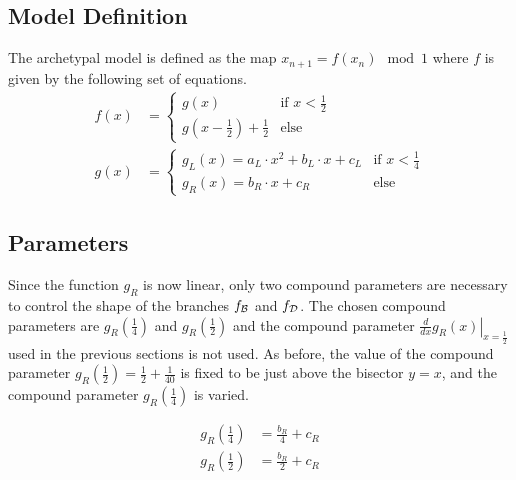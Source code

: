 \subsection{Model Definition}
\label{sec:setup.arch.definition}

The archetypal model is defined as the map $x_{n+1} = f(x_n) \mod 1$ where $f$ is given by the following set of equations.
\begin{align}
	f(x) & = \begin{cases}
		         g(x)                             & \text{if } x < \frac{1}{2} \\
		         g(x - \frac{1}{2}) + \frac{1}{2} & \text{else}
	         \end{cases} \label{equ:arch.f}           \\
	g(x) & = \begin{cases}
		         g_L(x) = a_L \cdot x^2 + b_L \cdot x + c_L & \text{if } x < \frac{1}{4} \\
		         g_R(x) = b_R \cdot x + c_R                 & \text{else}
	         \end{cases} \label{equ:arch.g}
\end{align}

\subsection{Parameters}
\label{sec:setup.arch.parameters}

Since the function $g_R$ is now linear, only two compound parameters are necessary to control the shape of the branches $f_{\mathcal{B}}$ and $f_{\mathcal{D}}$.
The chosen compound parameters are $g_R\left(\frac{1}{4}\right)$ and $g_R\left(\frac{1}{2}\right)$ and the compound parameter $\left. \frac{d}{dx} g_R(x) \right|_{x = \frac{1}{2}}$ used in the previous sections is not used.
As before, the value of the compound parameter $g_R\left(\frac{1}{2}\right) = \frac{1}{2} + \frac{1}{40}$ is fixed to be just above the bisector $y = x$, and the compound parameter $g_R\left(\frac{1}{4}\right)$ is varied.

\begin{subequations}
	\begin{align}
		g_R\left(\frac{1}{4}\right) & = \frac{b_R}{4} + c_R \label{equ:setup.arch.A} \\
		g_R\left(\frac{1}{2}\right) & = \frac{b_R}{2} + c_R \label{equ:setup.arch.B}
	\end{align}
\end{subequations}

